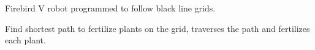 \documentclass[]{deedy-resume-openfont}
\begin{document}
\begin{minipage}[t]{0.66\textwidth}

\begin{tightemize}
    \item Firebird V robot programmed to follow black line grids.
    \item Find shortest path to fertilize plants on the grid, traverses the path and fertilizes each plant.
\end{tightemize}
\sectionsep


\end{minipage}
\end{document}
